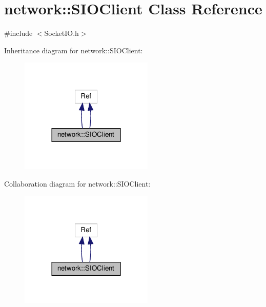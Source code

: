 \hypertarget{classnetwork_1_1SIOClient}{}\section{network\+:\+:S\+I\+O\+Client Class Reference}
\label{classnetwork_1_1SIOClient}


{\ttfamily \#include $<$Socket\+I\+O.\+h$>$}



Inheritance diagram for network\+:\+:S\+I\+O\+Client\+:
\nopagebreak
\begin{figure}[H]
\begin{center}
\leavevmode
\includegraphics[width=180pt]{classnetwork_1_1SIOClient__inherit__graph}
\end{center}
\end{figure}


Collaboration diagram for network\+:\+:S\+I\+O\+Client\+:
\nopagebreak
\begin{figure}[H]
\begin{center}
\leavevmode
\includegraphics[width=180pt]{classnetwork_1_1SIOClient__coll__graph}
\end{center}
\end{figure}
